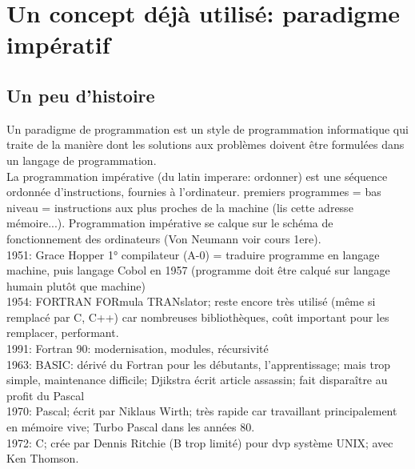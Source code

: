 \documentclass[a4paper,11pt]{article}
\begin{document}
\begin{Form}
\begin{center}
\end{center}
\section{Un concept déjà utilisé: paradigme impératif}
\begin{commentprof}
\subsection*{Un peu d'histoire}
Un paradigme de programmation est un style de programmation informatique qui traite de la manière dont les solutions aux problèmes doivent être formulées dans un langage de programmation.\\
La programmation impérative (du latin imperare: ordonner) est une séquence ordonnée d'instructions, fournies à l'ordinateur. premiers programmes = bas niveau = instructions aux plus proches de la machine (lis cette adresse mémoire...). Programmation impérative se calque sur le schéma de fonctionnement des ordinateurs (Von Neumann voir cours 1ere).\\1951: Grace Hopper 1° compilateur (A-0) = traduire programme en langage machine, puis langage Cobol en 1957 (programme doit être calqué sur langage humain plutôt que machine)\\1954: FORTRAN FORmula TRANslator; reste encore très utilisé (même si remplacé par C, C++) car nombreuses bibliothèques, coût important pour les remplacer, performant.\\1991: Fortran 90: modernisation, modules, récursivité\\1963: BASIC: dérivé du Fortran pour les débutants, l'apprentissage; mais trop simple, maintenance difficile; Djikstra écrit article assassin; fait disparaître au profit du Pascal\\1970: Pascal; écrit par Niklaus Wirth; très rapide car travaillant principalement en mémoire vive; Turbo Pascal dans les années 80.\\1972: C; crée par Dennis Ritchie (B trop limité) pour dvp système UNIX; avec Ken Thomson.
\end{commentprof}

\end{Form}
\end{document}
